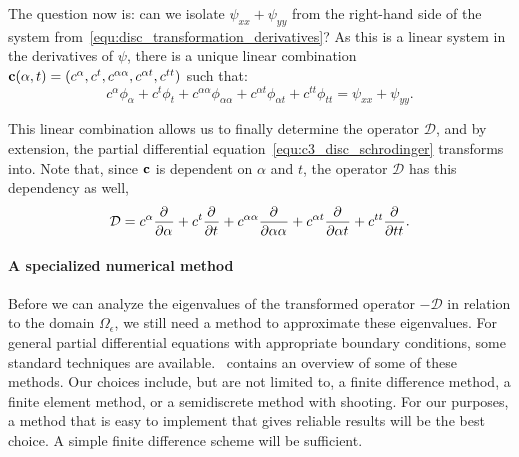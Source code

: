 The question now is: can we isolate $\psi_{xx} + \psi_{yy}$ from the right-hand side of the system from~\eqref{equ:disc_transformation_derivatives}? As this is a linear system in the derivatives of $\psi$, there is a unique linear combination $\vb{c}(\alpha, t) = (c^\alpha, c^t, c^{\alpha\alpha}, c^{\alpha t}, c^{tt})$ such that:
$$
  c^\alpha \phi_\alpha + c^t\phi_t + c^{\alpha\alpha}\phi_{\alpha\alpha} + c^{\alpha t} \phi_{\alpha t} + c^{tt} \phi_{tt} = \psi_{xx} + \psi_{yy}\text{.}
$$

This linear combination allows us to finally determine the operator $\mathcal{D}$, and by extension, the partial differential equation~\eqref{equ:c3_disc_schrodinger} transforms into. Note that, since $\vb{c}$ is dependent on $\alpha$ and $t$, the operator $\mathcal{D}$ has this dependency as well,
$$
  \mathcal{D} = c^\alpha {\pdv[]{}{\alpha}} + c^t \pdv[]{}{t} + c^{\alpha\alpha} \pdv[]{}{\alpha\alpha} + c^{\alpha t} \pdv[]{}{\alpha t} + c^{tt} \pdv[]{}{tt}\text{.}
$$

\paragraph{A specialized numerical method}

Before we can analyze the eigenvalues of the transformed operator $-\mathcal{D}$ in relation to the domain $\Omega_\epsilon$, we still need a method to approximate these eigenvalues. For general partial differential equations with appropriate boundary conditions, some standard techniques are available.~\cite[Chapter~11]{heath_scientific_2002} contains an overview of some of these methods. Our choices include, but are not limited to, a finite difference method, a finite element method, or a semidiscrete method with shooting. For our purposes, a method that is easy to implement that gives reliable results will be the best choice. A simple finite difference scheme will be sufficient.

